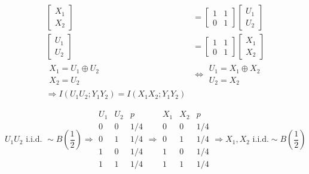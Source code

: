 \documentclass[twoside]{article}
\theoremstyle{definition} %
\newcommand{\pfrac}[2]{\left( \frac{#1}{#2} \right)}
\def\U{\mathcal{U}}
\def\X{\mathcal{X}}
\begin{document}
\begin{align*}
  \begin{bmatrix}
    X_1\\X_2
  \end{bmatrix}
  &=
  \begin{bmatrix}
    1 & 1 \\ 0 & 1
  \end{bmatrix}
  \begin{bmatrix}
    U_1 \\ U_2
  \end{bmatrix}\\
  \begin{bmatrix}
    U_1\\U_2
  \end{bmatrix}
  &=
  \begin{bmatrix}
    1 & 1 \\ 0 & 1
  \end{bmatrix}
  \begin{bmatrix}
    X_1 \\ X_2
  \end{bmatrix}\\
  \begin{matrix}
  X_1 = U_1 \oplus U_2\\
  X_2 = U_2
  \end{matrix} &\iff
  \begin{matrix}
  U_1 = X_1 \oplus X_2\\
  U_2 = X_2
  \end{matrix}\\
  \Rightarrow I(U_1U_2;Y_1Y_2) = I(X_1 X_2 ; Y_1Y_2)
\end{align*}

\[
  U_1U_2 \text{ i.i.d. } \sim B\pfrac 1 2 \Rightarrow
  \begin{array}{cc|c}
    U_1 & U_2 & p\\
    \hline
    0 & 0 & 1/4\\
    0 & 1 & 1/4\\
    1 & 0 & 1/4\\
    1 & 1 & 1/4
  \end{array}
  \Rightarrow
  \begin{array}{cc|c}
    X_1 & X_2 & p\\
    \hline
    0 & 0 & 1/4\\
    0 & 1 & 1/4\\
    1 & 0 & 1/4\\
    1 & 1 & 1/4
  \end{array}
  \Rightarrow
  X_1, X_2 \text{ i.i.d.} \sim B\pfrac 1 2
\]
\end{document}

